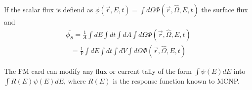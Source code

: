 If the scalar flux is defiend as $\phi(\vec{r},E,t)=\int d\Omega \Phi(\vec{r},\hat{\Omega},E,t) $ the surface flux and 
\newcommand{\AngularFlux}{\Phi \left ( \vec{r},\hat{\Omega},E,t \right )}
\begin{align}
    \label{eqn:F2TallyDef}
    \bar{\phi_S} = \frac{1}{A}\int dE \int dt \int dA \int d\Omega \AngularFlux
\end{align}
\begin{align}
    \label{eqn:F4TallyDef
    \bar{\phi_V} = \frac{1}{V}\int dE \int dt \int dV \int d\Omega \AngularFlux
\end{align}

The FM card can modify any flux or current tally of the form $\int \psi (E) dE$ into $\int R(E)\psi(E) dE$, where $R(E)$ is the response function known to MCNP.
